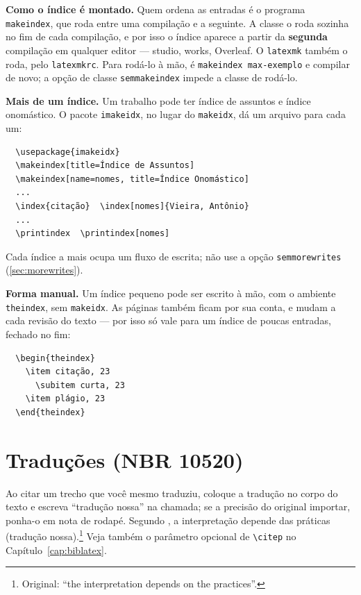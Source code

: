 \documentclass[dsc,pdfa,setavermelha]{ufrj}
\theoremstyle{plain}
\theoremstyle{definition}
\theoremstyle{remark}
\begin{document}
  \textbf{Como o índice é montado.} Quem ordena as entradas é o programa \verb|makeindex|, que roda entre uma compilação e a seguinte. A classe o roda sozinha no fim de cada compilação, e por isso o índice aparece a partir da \textbf{segunda} compilação em qualquer editor --- studio, works, Overleaf. O \verb|latexmk| também o roda, pelo \texttt{latexmkrc}. Para rodá-lo à mão, é \verb|makeindex max-exemplo| e compilar de novo; a opção de classe \verb|semmakeindex| impede a classe de rodá-lo.

  \textbf{Mais de um índice.} Um trabalho pode ter índice de assuntos e índice onomástico. O pacote \verb|imakeidx|, no lugar do \verb|makeidx|, dá um arquivo para cada um:
  \begin{verbatim}
  \usepackage{imakeidx}
  \makeindex[title=Índice de Assuntos]
  \makeindex[name=nomes, title=Índice Onomástico]
  ...
  \index{citação}  \index[nomes]{Vieira, Antônio}
  ...
  \printindex  \printindex[nomes]
  \end{verbatim}
  Cada índice a mais ocupa um fluxo de escrita; não use a opção \verb|semmorewrites| (\autoref{sec:morewrites}).

  \textbf{Forma manual.} Um índice pequeno pode ser escrito à mão, com o ambiente \verb|theindex|, sem \verb|makeidx|. As páginas também ficam por sua conta, e mudam a cada revisão do texto --- por isso só vale para um índice de poucas entradas, fechado no fim:
  \begin{verbatim}
  \begin{theindex}
    \item citação, 23
      \subitem curta, 23
    \item plágio, 23
  \end{theindex}
  \end{verbatim}

  \section{Traduções (NBR 10520)}

  Ao citar um trecho que você mesmo traduziu, coloque a tradução no corpo do texto e escreva ``tradução nossa'' na chamada; se a precisão do original importar, ponha-o em nota de rodapé. Segundo \citet[p.~45]{article-example}, a interpretação depende das práticas (tradução nossa).\footnote{Original: ``the interpretation depends on the practices''.} Veja também o parâmetro opcional de \verb|\citep| no Capítulo~\ref{cap:biblatex}.
\end{document}
